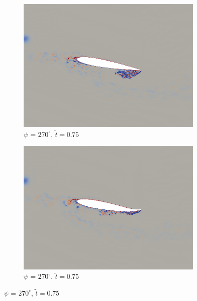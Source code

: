 \begin{figure}[H]\ContinuedFloat
	\centering
	
	\begin{subfigure}[b]{0.4\textwidth}
		\centering
		\includegraphics[width=1\textwidth]{figures/mu_1pt5/vorticity/baseline/phase_270.png}
		\caption{ $\psi$ = $270^\circ$, $\tilde{t}=0.75$}
		\label{fig:mu_1pt5_baseline_psi270}
	\end{subfigure}
	\begin{subfigure}[b]{0.4\textwidth}
		\centering
		\includegraphics[width=1\textwidth]{figures/mu_1pt5/vorticity/AC/phase_270.png}
		\caption{ $\psi$ = $270^\circ$, $\tilde{t}=0.75$}
		\label{fig:mu_1pt5_AC_psi270}
	\end{subfigure}
	

\end{figure}
